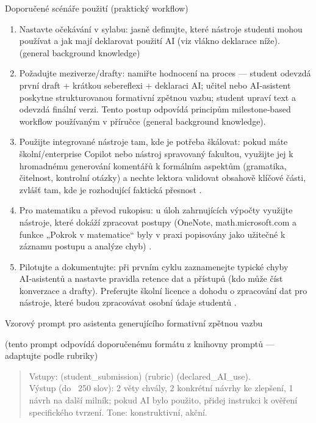\documentclass{report}%
\begin{document}
Doporučené scénáře použití (praktický workflow)
\begin{enumerate}
  \item Nastavte očekávání v sylabu: jasně definujte, které nástroje studenti mohou používat a jak mají deklarovat použití AI (viz vlákno deklarace níže). (general background knowledge)
  \item Požadujte meziverze/drafty: namiřte hodnocení na proces — student odevzdá první draft + krátkou sebereflexi + deklaraci AI; učitel nebo AI‑asistent poskytne strukturovanou formativní zpětnou vazbu; student upraví text a odevzdá finální verzi. Tento postup odpovídá principům milestone‑based workflow používaným v příručce (general background knowledge).
  \item Použijte integrované nástroje tam, kde je potřeba škálovat: pokud máte školní/enterprise Copilot nebo nástroj spravovaný fakultou, využijte jej k hromadnému generování komentářů k formálním aspektům (gramatika, čitelnost, kontrolní otázky) a nechte lektora validovat obsahově klíčové části, zvlášť tam, kde je rozhodující faktická přesnost \cite{kb_ai_101_tipu_pdf_04e4a115_page_3_1}.
  \item Pro matematiku a převod rukopisu: u úloh zahrnujících výpočty využijte nástroje, které dokáží zpracovat postupy (OneNote, math.microsoft.com a funkce „Pokrok v matematice“ byly v praxi popisovány jako užitečné k záznamu postupu a analýze chyb) \cite{kb_ai_101_tipu_pdf_04e4a115_page_8_1}.
  \item Pilotujte a dokumentujte: při prvním cyklu zaznamenejte typické chyby AI‑asistentů a nastavte pravidla retence dat a přístupů (kdo může číst konverzace a drafty). Preferujte školní licence a dohodu o zpracování dat pro nástroje, které budou zpracovávat osobní údaje studentů \cite{kb_ai_101_tipu_pdf_04e4a115_page_3_1}.
\end{enumerate}

Vzorový prompt pro asistenta generujícího formativní zpětnou vazbu
\vspace{0.5em}

\noindent (tento prompt odpovídá doporučenému formátu z knihovny promptů — adaptujte podle rubriky)
\begin{quote}
  Vstupy: (student_submission) (rubric) (declared_AI_use). \\
  Výstup (do ~250 slov): 2 věty chvály, 2 konkrétní návrhy ke zlepšení, 1 návrh na další milník; pokud AI bylo použito, přidej instrukci k ověření specifického tvrzení. Tone: konstruktivní, akční.
\end{quote}
\vspace{0.5em}
\end{document}
